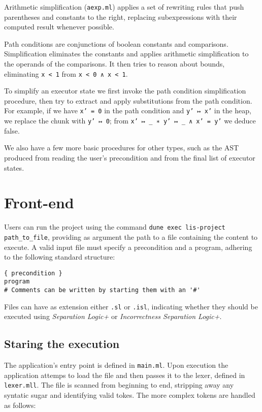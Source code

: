 \documentclass[parskip=half]{scrartcl}
\begin{document}
Arithmetic simplification (\texttt{aexp.ml}) applies a set of rewriting rules that push parentheses and constants to the right, replacing subexpressions with their computed result whenever possible.

Path conditions are conjunctions of boolean constants and comparisons. Simplification eliminates the constants and applies arithmetic simplification to the operands of the comparisons. It then tries to reason about bounds, \eg eliminating \texttt{x < 1} from \texttt{x < 0 ∧ x < 1}. %

To simplify an executor state we first invoke the path condition simplification procedure, then try to extract and apply substitutions from the path condition. For example, if we have \texttt{x' = 0} in the path condition and \texttt{y' ↦ x'} in the heap, we replace the chunk with \texttt{y' ↦ 0}; from \texttt{x' ↦ \_ ∗ y' ↦ \_ ∧ x' = y'} we deduce false.

We also have a few more basic procedures for other types, such as the AST produced from reading the user's precondition and from the final list of executor states.

\section{Front-end}
Users can run the project using the command \texttt{dune exec lis-project path\_to\_file},
providing as argument the path to a file containing the content to execute.
A valid input file must specify a precondition and a program, adhering to the following standard structure:

\begin{verbatim}
{ precondition }
program
# Comments can be written by starting them with an '#'
\end{verbatim}

Files can have as extension either \texttt{.sl} or \texttt{.isl}, 
indicating whether they should be executed using 
\textit{Separation Logic+} or \textit{Incorrectness Separation Logic+}.


\subsection{Staring the execution}
The application's entry point is defined in \texttt{main.ml}.
Upon execution the application attemps to load the file and then passes it to the lexer, defined in \texttt{lexer.mll}. 
The file is scanned from beginning to end, stripping away any syntatic sugar and identifying valid tokes.
The more complex tokens are handled as follows:
\end{document}
